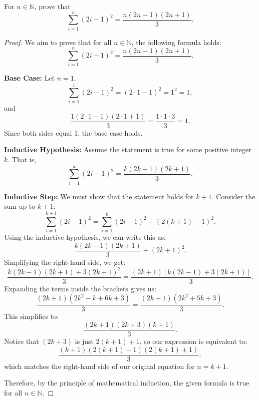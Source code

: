 \documentclass[
	12pt, %
	fleqn, %
	a4paper, %
]{LegrandOrangeBook}
\begin{document}
\begin{exercise}
    For \( n \in \mathbb{N} \), prove that
\[
\sum_{i=1}^{n} (2i - 1)^2 = \frac{n(2n-1)(2n+1)}{3}.
\]
\end{exercise}
\begin{proof}
    We aim to prove that for all \( n \in \mathbb{N} \), the following formula holds:
\[
\sum_{i=1}^{n} (2i - 1)^2 = \frac{n(2n-1)(2n+1)}{3}.
\]

\textbf{Base Case:}
Let \( n = 1 \).
\[
\sum_{i=1}^{1} (2i - 1)^2 = (2 \cdot 1 - 1)^2 = 1^2 = 1,
\]
and
\[
\frac{1(2 \cdot 1 - 1)(2 \cdot 1 + 1)}{3} = \frac{1 \cdot 1 \cdot 3}{3} = 1.
\]
Since both sides equal 1, the base case holds.

\textbf{Inductive Hypothesis:}
Assume the statement is true for some positive integer \( k \). That is,
\[
\sum_{i=1}^{k} (2i - 1)^2 = \frac{k(2k-1)(2k+1)}{3}.
\]

\textbf{Inductive Step:}
We must show that the statement holds for \( k+1 \). Consider the sum up to \( k+1 \):
\[
\sum_{i=1}^{k+1} (2i - 1)^2 = \sum_{i=1}^{k} (2i - 1)^2 + (2(k+1) - 1)^2.
\]
Using the inductive hypothesis, we can write this as:
\[
\frac{k(2k-1)(2k+1)}{3} + (2k+1)^2.
\]
Simplifying the right-hand side, we get:
\[
\frac{k(2k-1)(2k+1) + 3(2k+1)^2}{3} = \frac{(2k+1)[k(2k-1) + 3(2k+1)]}{3}.
\]
Expanding the terms inside the brackets gives us:
\[
\frac{(2k+1)(2k^2 - k + 6k + 3)}{3} = \frac{(2k+1)(2k^2 + 5k + 3)}{3}.
\]
This simplifies to:
\[
\frac{(2k+1)(2k+3)(k+1)}{3}.
\]
Notice that \( (2k+3) \) is just \( 2(k+1)+1 \), so our expression is equivalent to:
\[
\frac{(k+1)(2(k+1)-1)(2(k+1)+1)}{3},
\]
which matches the right-hand side of our original equation for \( n = k+1 \).

Therefore, by the principle of mathematical induction, the given formula is true for all \( n \in \mathbb{N} \).
\end{proof}
\end{document}
